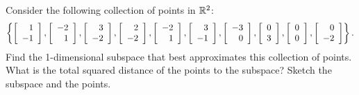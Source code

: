 \documentclass{ximera}
\author{Zack Reed}
\begin{document}
\begin{exercise}
  Consider the following collection of points in $\R^2$:
  \begin{equation*}
    \set{
      \startmat{r} 1 \\ -1 \stopmat,
      \startmat{r} -2 \\ 1 \stopmat,
      \startmat{r} 3 \\ -2 \stopmat,
      \startmat{r} 2 \\ -2 \stopmat,
      \startmat{r} -2 \\ 1 \stopmat,
      \startmat{r} 3 \\ -1 \stopmat,
      \startmat{r} -3 \\ 0 \stopmat,
      \startmat{r} 0 \\ 3 \stopmat,
      \startmat{r} 0 \\ 0 \stopmat,
      \startmat{r} 0 \\ -2 \stopmat
    }.
  \end{equation*}
  Find the 1-dimensional subspace that best approximates this
  collection of points. What is the total squared distance of the
  points to the subspace? Sketch the subspace and the points.
\end{exercise}
\end{document}
